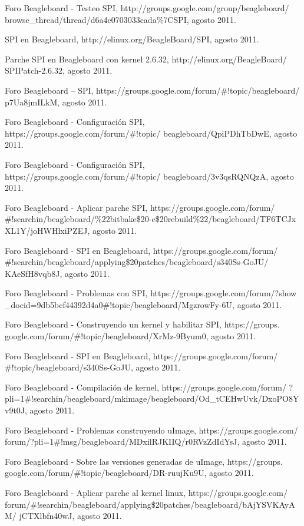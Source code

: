 \begin{thebibliography}{200}
\bibitem{} Foro Beagleboard - Testeo SPI, http://groups.google.com/group/beagleboard/
browse\_thread/thread/d6a4e0703033cada\%7CSPI, agosto 2011.

\bibitem{} SPI en Beagleboard, http://elinux.org/BeagleBoard/SPI, agosto 2011.

\bibitem{} Parche SPI en Beagleboard con kernel 2.6.32, http://elinux.org/BeagleBoard/
SPIPatch-2.6.32, agosto 2011.

\bibitem{} Foro Beagleboard – SPI, https://groups.google.com/forum/\#!topic/beagleboard/
p7Ua8jmILkM, agosto 2011.

\bibitem{} Foro Beagleboard - Configuración SPI, https://groups.google.com/forum/\#!topic/
beagleboard/QpiPDhTbDwE, agosto 2011.

\bibitem{} Foro Beagleboard - Configuración SPI, https://groups.google.com/forum/\#!topic/
beagleboard/3v3qsRQNQzA, agosto 2011.

\bibitem{} Foro Beagleboard - Aplicar parche SPI, https://groups.google.com/forum/
\#!searchin/beagleboard/\%22bitbake\$20-c\$20rebuild\%22/beagleboard/TF6TCJx
XL1Y/joHWHlxiPZEJ, agosto 2011.

\bibitem{} Foro Beagleboard - SPI en Beagleboard, https://groups.google.com/forum/
\#!searchin/beagleboard/applying\$20patches/beagleboard/s340Ss-GoJU/
KAeSfH8vqb8J, agosto 2011.

\bibitem{} Foro Beagleboard - Problemas con SPI, https://groups.google.com/forum/?show
\_docid=9db5bcf44392d4a0\#!topic/beagleboard/MgzrowFy-6U, agosto 2011.

\bibitem{} Foro Beagleboard - Construyendo un kernel y habilitar SPI, https://groups.
google.com/forum/\#!topic/beagleboard/XrMz-9Byum0, agosto 2011.

\bibitem{} Foro Beagleboard - SPI en Beagleboard, https://groups.google.com/forum/
\#!topic/beagleboard/s340Ss-GoJU, agosto 2011.

\bibitem{} Foro Beagleboard - Compilación de kernel, https://groups.google.com/forum/
?pli=1\#!searchin/beagleboard/mkimage/beagleboard/Od\_tCEHwUvk/DxoPO8Y
v9t0J, agosto 2011.

\bibitem{} Foro Beagleboard - Problemas construyendo uImage, https://groups.google.com/
forum/?pli=1\#!msg/beagleboard/MDxilRJKIIQ/r0RVzZdIdYsJ, agosto 2011.

\bibitem{} Foro Beagleboard - Sobre las versiones generadas de uImage, https://groups.
google.com/forum/\#!topic/beagleboard/DR-ruujKu9U, agosto 2011.

\bibitem{} Foro Beagleboard - Aplicar parche al kernel linux, https://groups.google.com/\\
forum/\#!searchin/beagleboard/applying\$20patches/beagleboard/bAjYSVKAyAM/
jCTXlbfn40wJ, agosto 2011.


\end{thebibliography}

